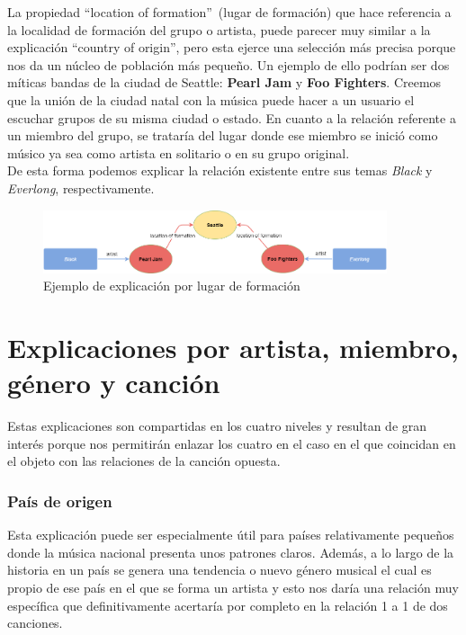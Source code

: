 La propiedad ``location of formation''~(lugar de formación) que hace referencia a la localidad de formación del grupo o artista, puede parecer muy similar a la explicación ``country of origin'', pero esta ejerce una selección más precisa porque nos da un núcleo de población más pequeño. Un ejemplo de ello podrían ser dos míticas bandas de la ciudad de Seattle: \textbf{Pearl Jam} y \textbf{Foo Fighters}. Creemos que la unión de la ciudad natal con la música puede hacer a un usuario el escuchar grupos de su misma ciudad o estado. En cuanto a la relación referente a un miembro del grupo, se trataría del lugar donde ese miembro se inició como músico ya sea como artista en solitario o en su grupo original.\\

De esta forma podemos explicar la relación existente entre sus temas \textit{Black} y \textit{Everlong}, respectivamente.\\

\begin{figure}[h!]
	\centering
	\includegraphics[width = 0.9\textwidth]{Imagenes/Bitmap/LocationOfFormation.png}
	\caption{Ejemplo de explicación por lugar de formación}
	\label{fig:sampleImage}
\end{figure}

\section{Explicaciones por artista, miembro, género y canción}

Estas explicaciones son compartidas en los cuatro niveles y resultan de gran interés porque nos permitirán enlazar los cuatro en el caso en el que coincidan en el objeto con las relaciones de la canción opuesta.\\

\subsubsection*{País de origen}

Esta explicación puede ser especialmente útil para países relativamente pequeños donde la música nacional presenta unos patrones claros. Además, a lo largo de la historia en un país se genera una tendencia o nuevo género musical el cual es propio de ese país en el que se forma un artista y esto nos daría una relación muy específica que definitivamente acertaría por completo en la relación 1 a 1 de dos canciones.\\

